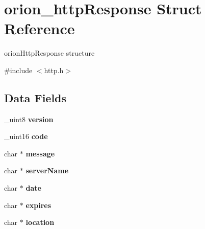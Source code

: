 \hypertarget{structorion__httpResponse}{
\section{orion\_\-httpResponse Struct Reference}
\label{structorion__httpResponse}
}


orionHttpResponse structure  




{\ttfamily \#include $<$http.h$>$}

\subsection*{Data Fields}
\begin{DoxyCompactItemize}
\item 
\hypertarget{structorion__httpResponse_a66448dd48b6943fcdb38c26676ce1da2}{
\_\-uint8 {\bfseries version}}
\label{structorion__httpResponse_a66448dd48b6943fcdb38c26676ce1da2}

\item 
\hypertarget{structorion__httpResponse_ac1b503937ec426e43bcecc35d8e3abb2}{
\_\-uint16 {\bfseries code}}
\label{structorion__httpResponse_ac1b503937ec426e43bcecc35d8e3abb2}

\item 
\hypertarget{structorion__httpResponse_a727cb1a29b2f86105987f32925cdd093}{
char $\ast$ {\bfseries message}}
\label{structorion__httpResponse_a727cb1a29b2f86105987f32925cdd093}

\item 
\hypertarget{structorion__httpResponse_a6ac6b482e13001c6638d4bd3640df5b3}{
char $\ast$ {\bfseries serverName}}
\label{structorion__httpResponse_a6ac6b482e13001c6638d4bd3640df5b3}

\item 
\hypertarget{structorion__httpResponse_a50a6c19e8816251771a937e0174a0811}{
char $\ast$ {\bfseries date}}
\label{structorion__httpResponse_a50a6c19e8816251771a937e0174a0811}

\item 
\hypertarget{structorion__httpResponse_a06eef6c38cd80ac50b32b0bba3ba715d}{
char $\ast$ {\bfseries expires}}
\label{structorion__httpResponse_a06eef6c38cd80ac50b32b0bba3ba715d}

\item 
\hypertarget{structorion__httpResponse_a7a944d185ca433cc1e14149baa5d331e}{
char $\ast$ {\bfseries location}}
\label{structorion__httpResponse_a7a944d185ca433cc1e14149baa5d331e}


\end{DoxyCompactItemize}
